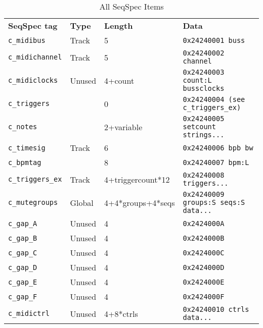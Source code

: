    \begin{table}[htb]
      \centering
      \caption{All SeqSpec Items}
      \label{table:seqspec_items_all}
      \begin{tabular}{l l l l}
         \textbf{SeqSpec tag}        & \textbf{Type} & \textbf{Length}   & \textbf{Data} \\
         \texttt{c\_midibus}         & Track         & 5                 & \texttt{0x24240001 buss} \\
         \texttt{c\_midichannel}     & Track         & 5                 & \texttt{0x24240002 channel} \\
         \texttt{c\_midiclocks}      & Unused        & 4+count           & \texttt{0x24240003 count:L bussclocks} \\
         \texttt{c\_triggers}        &               & 0                 & \texttt{0x24240004 (see c\_triggers\_ex)} \\
         \texttt{c\_notes}           &               & 2+variable        & \texttt{0x24240005 setcount strings...} \\
         \texttt{c\_timesig}         & Track         & 6                 & \texttt{0x24240006 bpb bw} \\
         \texttt{c\_bpmtag}          &               & 8                 & \texttt{0x24240007 bpm:L } \\
         \texttt{c\_triggers\_ex}    & Track         & 4+triggercount*12 & \texttt{0x24240008 triggers...} \\
         \texttt{c\_mutegroups}      & Global        & 4+4*groups+4*seqs & \texttt{0x24240009 groups:S seqs:S data...} \\
         \texttt{c\_gap\_A}          & Unused        & 4                 & \texttt{0x2424000A} \\
         \texttt{c\_gap\_B}          & Unused        & 4                 & \texttt{0x2424000B} \\
         \texttt{c\_gap\_C}          & Unused        & 4                 & \texttt{0x2424000C} \\
         \texttt{c\_gap\_D}          & Unused        & 4                 & \texttt{0x2424000D} \\
         \texttt{c\_gap\_E}          & Unused        & 4                 & \texttt{0x2424000E} \\
         \texttt{c\_gap\_F}          & Unused        & 4                 & \texttt{0x2424000F} \\
         \texttt{c\_midictrl}        & Unused        & 4+8*ctrls         & \texttt{0x24240010 ctrls data...} \\

\end{tabular}
\end{table}
